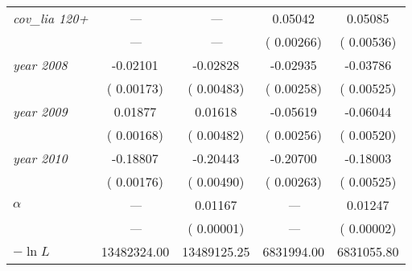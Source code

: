 {\begin{ThreePartTable}
\begin{longtable}{lcccc}
    \textit{cov\_lia 120+} & \textit{---} & \textit{---} &  0.05042 &  0.05085 \\
    & \scriptsize{\textit{---}} & \scriptsize{\textit{---}} & \scriptsize{( 0.00266)} & \scriptsize{( 0.00536)} \\
    \textit{year 2008} & -0.02101 & -0.02828 & -0.02935 & -0.03786 \\
    & \scriptsize{( 0.00173)} & \scriptsize{( 0.00483)} & \scriptsize{( 0.00258)} & \scriptsize{( 0.00525)} \\
    \textit{year 2009} &  0.01877 &  0.01618 & -0.05619 & -0.06044 \\
    & \scriptsize{( 0.00168)} & \scriptsize{( 0.00482)} & \scriptsize{( 0.00256)} & \scriptsize{( 0.00520)} \\
    \textit{year 2010} & -0.18807 & -0.20443 & -0.20700 & -0.18003 \\
    & \scriptsize{( 0.00176)} & \scriptsize{( 0.00490)} & \scriptsize{( 0.00263)} & \scriptsize{( 0.00525)} \\
    $\alpha$ & \textit{---} &  0.01167 & \textit{---} &  0.01247 \\
    & \scriptsize{\textit{---}} & \scriptsize{( 0.00001)} & \scriptsize{\textit{---}} & \scriptsize{( 0.00002)} \\
    $-\ln L$ & 13482324.00 & 13489125.25 & 6831994.00 & 6831055.80 \\
\end{longtable}
\end{ThreePartTable}
}
